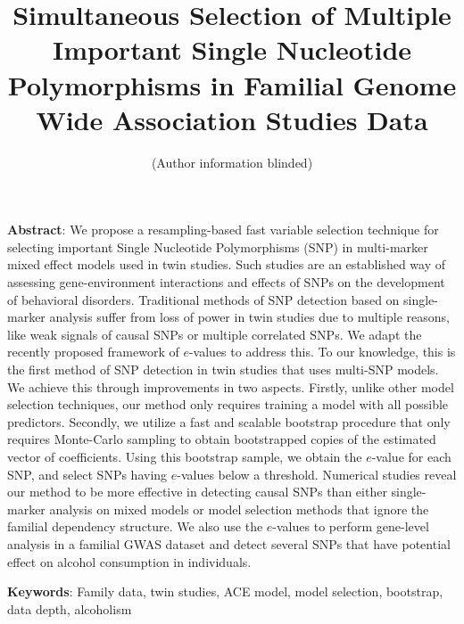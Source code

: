 \documentclass[fleqn,12pt]{article}
\numberwithin{equation}{section}
\begin{document}
\newtheorem{Theorem}{Theorem}[section]
\newtheorem{Lemma}[Theorem]{Lemma}
\newtheorem{Corollary}[Theorem]{Corollary}
\newtheorem{Proposition}[Theorem]{Proposition}
\newtheorem{Conjecture}[Theorem]{Conjecture}
\theoremstyle{definition} \newtheorem{Definition}[Theorem]{Definition}

\title{Simultaneous Selection of Multiple Important Single Nucleotide Polymorphisms in Familial Genome Wide Association Studies Data}
\date{}
\author{(Author information blinded)}
\maketitle

\noindent\textbf{Abstract}: We propose a resampling-based fast variable selection technique for selecting important Single Nucleotide Polymorphisms (SNP) in multi-marker mixed effect models used in twin studies. Such studies are an established way of assessing gene-environment interactions and effects of SNPs on the development of behavioral disorders. Traditional methods of SNP detection based on single-marker analysis suffer from loss of power in twin studies due to multiple reasons, like weak signals of causal SNPs or multiple correlated SNPs. We adapt the recently proposed framework of $e$-values to address this. To our knowledge, this is the first method of SNP detection in twin studies that uses multi-SNP models. We achieve this through improvements in two aspects. Firstly, unlike other model selection techniques, our method only requires training a model with all possible predictors. Secondly, we utilize a fast and scalable bootstrap procedure that only requires Monte-Carlo sampling to obtain bootstrapped copies of the estimated vector of coefficients. Using this bootstrap sample, we obtain the $e$-value for each SNP, and select SNPs having $e$-values below a threshold. Numerical studies reveal our method to be more effective in detecting causal SNPs than either single-marker analysis on mixed models or model selection methods that ignore the familial dependency structure. We also use the $e$-values to perform gene-level analysis in a familial GWAS dataset and detect several SNPs that have potential effect on alcohol consumption in individuals.

\noindent\textbf{Keywords}: Family data, twin studies, ACE model, model selection, bootstrap, data depth, alcoholism

\newpage










\end{document}
